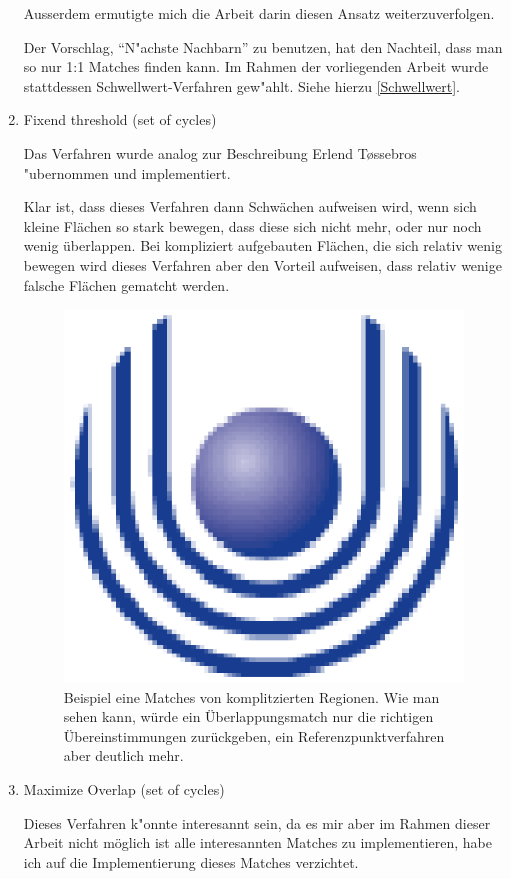 \begin{enumerate}
Ausserdem ermutigte mich die Arbeit \cite{AFRW} darin diesen Ansatz weiterzuverfolgen.

Der Vorschlag, "`N"achste Nachbarn"' zu benutzen, hat den Nachteil, dass man so nur 1:1 Matches finden kann. Im Rahmen der vorliegenden Arbeit wurde stattdessen Schwellwert-Verfahren gew"ahlt. Siehe hierzu \ref{Schwellwert}.

\item Fixend threshold (set of cycles)

Das Verfahren wurde analog zur Beschreibung Erlend T\o{}ssebros "ubernommen und implementiert. 

Klar ist, dass dieses Verfahren dann Schwächen aufweisen wird, wenn sich kleine Flächen so stark bewegen, dass diese sich nicht mehr, oder nur noch wenig überlappen. Bei kompliziert aufgebauten Flächen, die sich relativ wenig bewegen wird dieses Verfahren aber den Vorteil aufweisen, dass relativ wenige falsche Flächen gematcht werden.

\begin{figure}
	\centering
	\includegraphics{feu_logo2.eps}
	\caption[Beispiel für den Vorteil des Overlaping-Match]{Beispiel eine Matches von komplitzierten Regionen. Wie man sehen kann, würde ein Überlappungsmatch nur die richtigen Übereinstimmungen zurückgeben, ein Referenzpunktverfahren aber deutlich mehr.}
	\label{fig:OverlapVorteil}
\end{figure}


\item Maximize Overlap (set of cycles)

Dieses Verfahren k"onnte interesannt sein, da es mir aber im  Rahmen dieser Arbeit nicht möglich ist alle interesannten Matches zu implementieren, habe ich auf die Implementierung dieses Matches verzichtet.

\end{enumerate}

